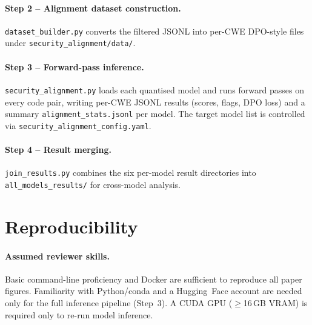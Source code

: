 \documentclass[conference]{IEEEtran}
\begin{document}
\paragraph{Step 2 -- Alignment dataset construction.}
\texttt{dataset\_builder.py} converts the filtered JSONL into per-CWE
DPO-style files under \texttt{security\_alignment/data/}.

\paragraph{Step 3 -- Forward-pass inference.}
\texttt{security\_alignment.py} loads each quantised model and runs forward
passes on every code pair, writing per-CWE JSONL results (scores, flags,
DPO loss) and a summary \texttt{alignment\_stats.jsonl} per model. The target
model list is controlled via \texttt{security\_alignment\_config.yaml}.

\paragraph{Step 4 -- Result merging.}
\texttt{join\_results.py} combines the six per-model result directories into
\texttt{all\_models\_results/} for cross-model analysis.

\vspace{0.5cm}
\section{Reproducibility}

\paragraph{Assumed reviewer skills.}
Basic command-line proficiency and Docker are sufficient to reproduce all paper
figures. Familiarity with Python/conda and a Hugging~Face account are needed
only for the full inference pipeline (Step~3). A CUDA GPU ($\geq$16\,GB VRAM)
is required only to re-run model inference.

\end{document}
